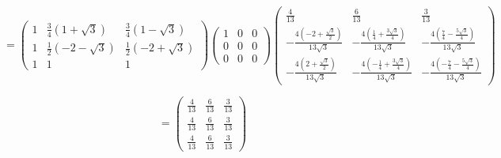 \documentclass[a4paper,12pt]{article} %
\begin{document}
\begin{example}
\[ =\left(\begin{array}{ccc}
1 & \frac{3}{4}(1+\sqrt{3}) & \frac{3}{4}(1-\sqrt{3}) \\
1 & \frac{1}{2}(-2-\sqrt{3}) & \frac{1}{2}(-2+\sqrt{3}) \\
1 & 1 & 1
\end{array}\right)
\left(\begin{array}{lll}
	1 & 0 & 0 \\
	0 & 0 & 0 \\
	0 & 0 & 0
\end{array}\right)
\left(\begin{array}{ccc}
	\frac{4}{13} & \frac{6}{13} & \frac{3}{13} \\
	-\frac{4\left(-2+\frac{\sqrt{3}}{2}\right)}{13 \sqrt{3}} & -\frac{4\left(\frac{1}{4}+\frac{3 \sqrt{3}}{4}\right)}{13 \sqrt{3}} & -\frac{4\left(\frac{7}{4}-\frac{5 \sqrt{3}}{4}\right)}{13 \sqrt{3}} \\
	-\frac{4\left(2+\frac{\sqrt{3}}{2}\right)}{13 \sqrt{3}} & -\frac{4\left(-\frac{1}{4}+\frac{3 \sqrt{3}}{4}\right)}{13 \sqrt{3}} & -\frac{4\left(-\frac{7}{4}-\frac{5 \sqrt{3}}{4}\right)}{13 \sqrt{3}}
\end{array}\right)
\]



\[ =\left(\begin{array}{ccc}
\frac{4}{13} & \frac{6}{13} & \frac{3}{13} \\
\frac{4}{13} & \frac{6}{13} & \frac{3}{13} \\
\frac{4}{13} & \frac{6}{13} & \frac{3}{13}
\end{array}\right) \]






\end{example}
\end{document}
